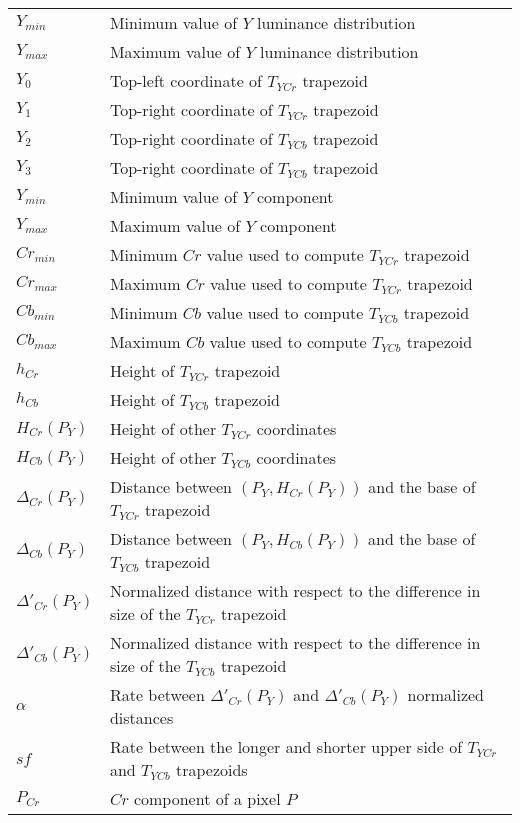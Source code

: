 \documentclass[11pt,twoside,a4paper]{book}
\theoremstyle{plain}
\theoremstyle{definition}
\begin{document}
\begin{tabular}{ll}
    $Y_{min}$   & Minimum value of $Y$ luminance distribution \\
    $Y_{max}$   & Maximum value of $Y$ luminance distribution \\
    $Y_{0}$     & Top-left coordinate of $T_{YCr}$ trapezoid \\
    $Y_{1}$     & Top-right coordinate of $T_{YCr}$ trapezoid \\
    $Y_{2}$     & Top-right coordinate of $T_{YCb}$ trapezoid \\
    $Y_{3}$     & Top-right coordinate of $T_{YCb}$ trapezoid \\
    $Y_{min}$   & Minimum value of $Y$ component \\
    $Y_{max}$   & Maximum value of $Y$ component \\
    $Cr_{min}$  & Minimum $Cr$ value used to compute $T_{YCr}$ trapezoid \\
    $Cr_{max}$  & Maximum $Cr$ value used to compute $T_{YCr}$ trapezoid \\
    $Cb_{min}$  & Minimum $Cb$ value used to compute $T_{YCb}$ trapezoid \\
    $Cb_{max}$  & Maximum $Cb$ value used to compute $T_{YCb}$ trapezoid \\
    $h_{Cr}$    & Height of $T_{YCr}$ trapezoid \\
    $h_{Cb}$    & Height of $T_{YCb}$ trapezoid \\
    $H_{Cr}(P_Y)$& Height of other $T_{YCr}$ coordinates \\
    $H_{Cb}(P_Y)$& Height of other $T_{YCb}$ coordinates \\
    $\Delta_{Cr}(P_Y)$& Distance between $(P_Y, H_{Cr}(P_Y))$ and the base of $T_{YCr}$ trapezoid \\
    $\Delta_{Cb}(P_Y)$& Distance between $(P_Y, H_{Cb}(P_Y))$ and the base of $T_{YCb}$ trapezoid \\
    $\Delta'_{Cr}(P_Y)$& Normalized distance with respect to the difference in size of the $T_{YCr}$ trapezoid \\
    $\Delta'_{Cb}(P_Y)$& Normalized distance with respect to the difference in size of the $T_{YCb}$ trapezoid \\
    $\alpha$    & Rate between $\Delta'_{Cr}(P_Y)$ and $\Delta'_{Cb}(P_Y)$ normalized distances \\
    $sf$        & Rate between the longer and shorter upper side of $T_{YCr}$ and $T_{YCb}$ trapezoids \\
    $P_{Cr}$    & $Cr$ component of a pixel $P$ \\

\end{tabular}
\end{document}
